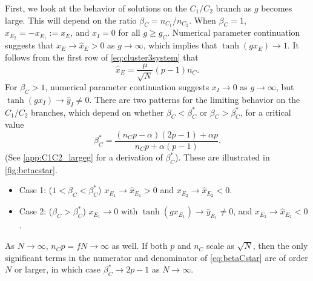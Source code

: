 \documentclass[reqno]{siamonline190516}
\begin{document}
First, we look at the behavior of solutions on the $C_1/C_2$ branch as $g$ becomes large. This will depend on the ratio $\beta_C = n_{C_1}/n_{C_2}$. When $\beta_C = 1$, $x_{E_2} = -x_{E_1} := x_E$, and $x_I = 0$ for all $g \geq g_C$. Numerical parameter continuation suggests that $x_{E} \rightarrow \hat{x}_{E} > 0$ as $g \rightarrow \infty$, which implies that $\tanh(g x_{E}) \rightarrow 1$. It follows from the first row of \cref{eq:cluster3system} that 
\begin{equation}\label{eq:xEhat}
\hat{x}_{E} = \frac{\mu}{\sqrt{N}}(p-1)n_C.
\end{equation}
For $\beta_C > 1$, numerical parameter continuation suggests $x_I \rightarrow 0$ as $g \rightarrow \infty$, but $\tanh(g x_I) \rightarrow \hat{y}_I \neq 0$. There are two patterns for the limiting behavior on the $C_1/C_2$ branches, which depend on whether $\beta_C < \beta_C^*$ or $\beta_C > \beta_C^*$, for a critical value
\begin{equation}\label{eq:betaCstar}
    \beta_C^* = \frac{(n_C p - \alpha )(2 p - 1) + \alpha p}{n_C p + \alpha(p-1)}.
\end{equation}
(See \cref{app:C1C2_largeg} for a derivation of $\beta_C^*$). These are illustrated in \cref{fig:betacstar}.
\begin{itemize}
    \item Case 1: ($1 < \beta_C < \beta_C^*$) $x_{E_1} \rightarrow \hat{x}_{E_1} > 0$ and $x_{E_2} \rightarrow \hat{x}_{E_2} < 0$. 
    \item Case 2: ($\beta_C > \beta_C^*$) $x_{E_1} \rightarrow 0$ with $\tanh(g x_{E_1}) \rightarrow \hat{y}_{E_1} \neq 0$, and $x_{E_2} \rightarrow \hat{x}_{E_2} < 0$.\\
\end{itemize}
As $N \rightarrow \infty$, $n_C p = f N \rightarrow \infty$ as well. If both $p$ and $n_C$ scale as $\sqrt{N}$, then the only significant terms in the numerator and denominator of \cref{eq:betaCstar} are of order $N$ or larger, in which case $\beta_C^* \rightarrow 2 p-1$ as $N \rightarrow \infty$. 
\end{document}
